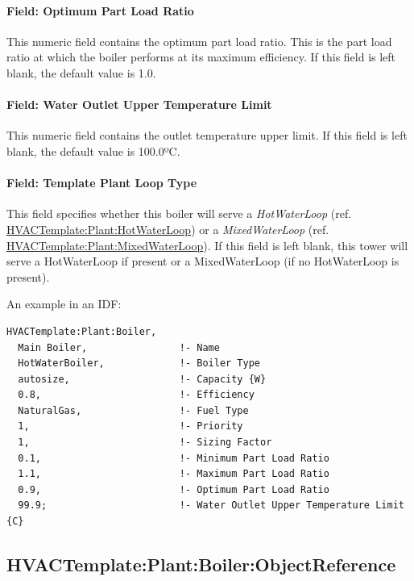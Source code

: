 \paragraph{Field: Optimum Part Load Ratio}\label{field-optimum-part-load-ratio-1-000}

This numeric field contains the optimum part load ratio. This is the part load ratio at which the boiler performs at its maximum efficiency. If this field is left blank, the default value is 1.0.

\paragraph{Field: Water Outlet Upper Temperature Limit}\label{field-water-outlet-upper-temperature-limit}

This numeric field contains the outlet temperature upper limit. If this field is left blank, the default value is 100.0ºC.

\paragraph{Field: Template Plant Loop Type}\label{field-template-plant-loop-type-2}

This field specifies whether this boiler will serve a \emph{HotWaterLoop} (ref. \hyperref[hvactemplateplanthotwaterloop]{HVACTemplate:Plant:HotWaterLoop}) or a \emph{MixedWaterLoop} (ref. \hyperref[hvactemplateplantmixedwaterloop]{HVACTemplate:Plant:MixedWaterLoop}). If this field is left blank, this tower will serve a HotWaterLoop if present or a MixedWaterLoop (if no HotWaterLoop is present).

An example in an IDF:

\begin{lstlisting}
HVACTemplate:Plant:Boiler,
  Main Boiler,                !- Name
  HotWaterBoiler,             !- Boiler Type
  autosize,                   !- Capacity {W}
  0.8,                        !- Efficiency
  NaturalGas,                 !- Fuel Type
  1,                          !- Priority
  1,                          !- Sizing Factor
  0.1,                        !- Minimum Part Load Ratio
  1.1,                        !- Maximum Part Load Ratio
  0.9,                        !- Optimum Part Load Ratio
  99.9;                       !- Water Outlet Upper Temperature Limit {C}
\end{lstlisting}

\subsection{HVACTemplate:Plant:Boiler:ObjectReference}\label{hvactemplateplantboilerobjectreference}

